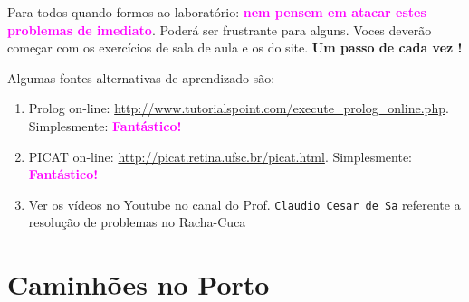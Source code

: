 \documentclass[a4paper,12pt]{article}
\begin{document}
\newpage

\begin{center}

\vskip 2cm
{\Large
Para todos quando formos ao laboratório: \textbf{\textcolor{magenta}{nem pensem em atacar estes problemas de imediato}}. Poderá ser frustrante para alguns. Voces deverão começar com os exercícios de sala de aula e os do site. \textbf{Um passo de cada vez !}
}
\vskip 2cm
\end{center}

Algumas fontes alternativas de aprendizado s\~ao:

\begin{enumerate}



\item Prolog on-line: \url{http://www.tutorialspoint.com/execute_prolog_online.php}. Simplesmente: \textbf{\textcolor{magenta}{Fantástico!}}

\item PICAT on-line: \url{http://picat.retina.ufsc.br/picat.html}. Simplesmente: \textbf{\textcolor{magenta}{Fantástico!}}



 
 \item Ver os vídeos no Youtube no canal do Prof. \texttt{Claudio Cesar de Sa} referente
 a resolução de problemas no Racha-Cuca

\end{enumerate}





\newpage
\tableofcontents


\newpage
\section{Caminhões no Porto}
\end{document}
